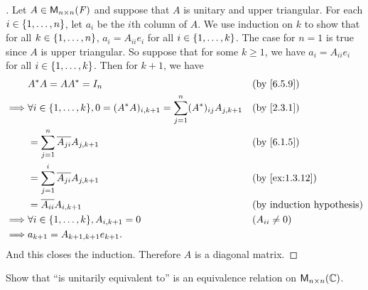\begin{proof}[]
  Let \(A \in \ms[n][n][\F]\) and suppose that \(A\) is unitary and upper triangular.
  For each \(i \in \left\lbrace1, \dots, n\right\rbrace\), let \(a_i\) be the \(i\)th column of \(A\).
  We use induction on \(k\) to show that for all \(k \in \left\lbrace1, \dots, n\right\rbrace\), \(a_i = A_{i i} e_i\) for all \(i \in \left\lbrace1, \dots, k\right\rbrace\).
  The case for \(n = 1\) is true since \(A\) is upper triangular.
  So suppose that for some \(k \geq 1\), we have \(a_i = A_{i i} e_i\) for all \(i \in \left\lbrace1, \dots, k\right\rbrace\).
  Then for \(k + 1\), we have
  \begin{align*}
             & A^* A = A A^* = I_n                                                                               &  & \by{6.5.9}                       \\
    \implies & \forall i \in \set{1, \dots, k}, 0 = (A^* A)_{i, k + 1} = \sum_{j = 1}^n (A^*)_{i j} A_{j, k + 1} &  & \by{2.3.1}                       \\
             & = \sum_{j = 1}^n \conj{A_{j i}} A_{j, k + 1}                                                      &  & \by{6.1.5}                       \\
             & = \sum_{j = 1}^i \conj{A_{j i}} A_{j, k + 1}                                                      &  & \by{ex:1.3.12}                   \\
             & = \conj{A_{i i}} A_{i, k + 1}                                                                     &  & \text{(by induction hypothesis)} \\
    \implies & \forall i \in \set{1, \dots, k}, A_{i, k + 1} = 0                                                 &  & (A_{i i} \neq 0)                 \\
    \implies & a_{k + 1} = A_{k + 1, k + 1} e_{k + 1}.
  \end{align*}
  And this closes the induction.
  Therefore \(A\) is a diagonal matrix.
\end{proof}

\begin{ex}\label{ex:6.5.18}
  Show that ``is unitarily equivalent to'' is an equivalence relation on \(\ms[n][n][\C]\).
\end{ex}

